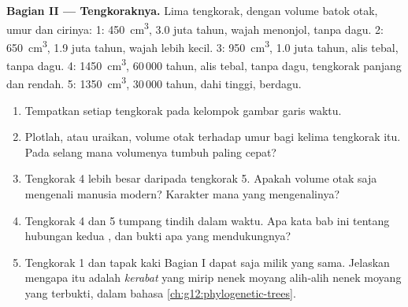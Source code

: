 \begin{problem}
\medskip
\noindent\textbf{Bagian II --- Tengkoraknya.}
Lima tengkorak, dengan volume batok otak, umur dan cirinya:
1: \qty{450}{cm^3}, 3.0 juta tahun, wajah menonjol, tanpa dagu.
2: \qty{650}{cm^3}, 1.9 juta tahun, wajah lebih kecil.
3: \qty{950}{cm^3}, 1.0 juta tahun, alis tebal, tanpa dagu.
4: \qty{1450}{cm^3}, 60\,000 tahun, alis tebal, tanpa dagu, tengkorak
panjang dan rendah.
5: \qty{1350}{cm^3}, 30\,000 tahun, dahi tinggi, berdagu.
\begin{enumerate}[resume]
  \item Tempatkan setiap tengkorak pada kelompok gambar garis waktu.
  \item Plotlah, atau uraikan, volume otak terhadap umur bagi kelima
        tengkorak itu. Pada selang mana volumenya tumbuh paling cepat?
  \item Tengkorak 4 lebih besar daripada tengkorak 5. Apakah volume
        otak saja mengenali manusia modern? Karakter mana yang
        mengenalinya?
  \item Tengkorak 4 dan 5 tumpang tindih dalam waktu. Apa kata bab ini
        tentang hubungan kedua , dan bukti apa yang
        mendukungnya?
  \item Tengkorak 1 dan tapak kaki Bagian I dapat saja milik 
        yang sama. Jelaskan mengapa  itu adalah \emph{kerabat}
        yang mirip nenek moyang alih-alih nenek moyang yang terbukti,
        dalam bahasa \cref{ch:g12:phylogenetic-trees}.
\end{enumerate}


\end{problem}
